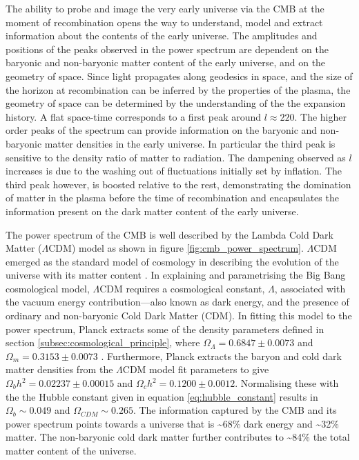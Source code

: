 The ability to probe and image the very early universe via the CMB at the moment of recombination opens the way to understand, model and extract information about the contents of the early universe. The amplitudes and positions of the peaks observed in the power spectrum are dependent on the baryonic and non-baryonic matter content of the early universe, and on the geometry of space. Since light propagates along geodesics in space, and the size of the horizon at recombination can be inferred by the properties of the plasma, the geometry of space can be determined by the understanding of the the expansion history. A flat space-time corresponds to a first peak around $l\approx220$. The higher order peaks of the spectrum can provide information on the baryonic and non-baryonic matter densities in the early universe. In particular the third peak is sensitive to the density ratio of matter to radiation. The dampening observed as $l$ increases is due to the washing out of fluctuations initially set by inflation. The third peak however, is boosted relative to the rest, demonstrating the domination of matter in the plasma before the time of recombination and encapsulates the information present on the dark matter content of the early universe.

The power spectrum of the CMB is well described by the Lambda Cold Dark Matter ($\Lambda$CDM) model as shown in figure \ref{fig:cmb_power_spectrum}. $\Lambda$CDM emerged as the standard model of cosmology in describing the evolution of the universe with its matter content \cite{Modern_Cosmology}. In explaining and parametrising the Big Bang cosmological model, $\Lambda$CDM requires a cosmological constant, $\Lambda$, associated with the vacuum energy contribution---also known as dark energy, and the presence of ordinary and non-baryonic Cold Dark Matter (CDM). In fitting this model to the power spectrum, Planck extracts some of the density parameters defined in section \ref{subsec:cosmological_principle}, where $\Omega_{\Lambda} =  0.6847 \pm 0.0073$ and $\Omega_{m} =  0.3153 \pm 0.0073$ \cite{Plank_2018, Plank_2018_2}. Furthermore, Planck extracts the baryon and cold dark matter densities from the $\Lambda$CDM model fit parameters to give $\Omega_{b}h^2 = 0.02237 \pm 0.00015$ and $\Omega_{c}h^2 = 0.1200 \pm 0.0012$. Normalising these with the the Hubble constant given in equation \ref{eq:hubble_constant} results in $\Omega_{b} \sim 0.049$ and $\Omega_{CDM} \sim 0.265$. The information captured by the CMB and its power spectrum points towards a universe that is \sim 68\% dark energy and \sim 32\% matter. The non-baryonic cold dark matter further contributes to \sim 84\% the total matter content of the universe.


